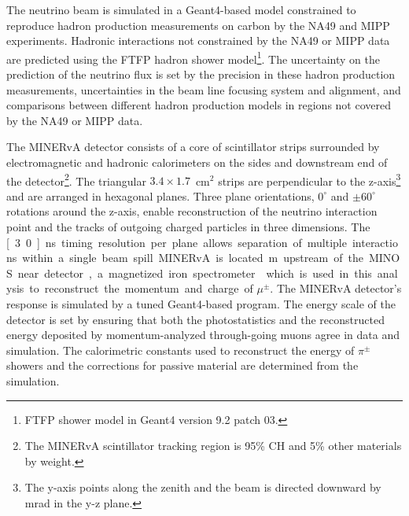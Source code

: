 \documentclass[aps,prl,twocolumn,showpacs,superscriptaddress,nofootinbib]{revtex4}
\newcommand{\minerva}{MINERvA\xspace}
\begin{document}
The neutrino beam is simulated in a Geant4-based
model\cite{Agostinelli2003250,1610988} constrained to
reproduce hadron production measurements on carbon by the NA49 and MIPP experiments\cite{Alt:2006fr,Lebedev:2007zz}.  
Hadronic interactions not constrained by the NA49 or MIPP data are predicted
using the FTFP hadron shower model\footnote{{F}TFP shower model in
Geant4 version 9.2 patch 03.}.  The uncertainty on the prediction of
the neutrino flux is set by the precision in these hadron production
measurements, uncertainties in the beam line focusing system and
alignment\cite{Pavlovic:2008zz}, and comparisons between different
hadron production models in regions not covered by the NA49 or MIPP
data.


The \minerva detector consists of a core of scintillator
strips surrounded by electromagnetic and hadronic calorimeters on the
sides and downstream end of the detector\footnote{The \minerva
scintillator tracking region is 95\% CH and 5\% other materials by
weight.}\cite{minerva_nim}.  The triangular $3.4\times1.7$~cm$^2$ strips are perpendicular to the
z-axis\footnote{The y-axis points along the zenith and the beam is directed downward by \unit[58]{mrad} in the y-z plane.} and are arranged in hexagonal planes.
Three plane orientations, $0^\circ$ and $\pm 60^\circ$
rotations around the z-axis, enable reconstruction of the neutrino
interaction point and the tracks of outgoing charged particles in three dimensions. The \unit[3.0]{ns}
timing resolution per plane allows separation of multiple interactions within a
single beam spill.  
\minerva is located \unit[2]{m} upstream of the MINOS near detector, 
a magnetized iron spectrometer\cite{Michael:2008bc} which is  used
in this analysis to reconstruct the momentum and charge of $\mu^\pm$.
The \minerva detector's response is simulated by a tuned 
Geant4-based\cite{Agostinelli2003250,1610988} program.  
The energy scale of the detector is set by ensuring
that both the photostatistics and the reconstructed energy deposited by
momentum-analyzed through-going muons agree in data and simulation.
The calorimetric constants used to reconstruct the energy of
$\pi^\pm$ showers and the corrections for passive material are
determined from the simulation\cite{minerva_nim}.  
\end{document}
